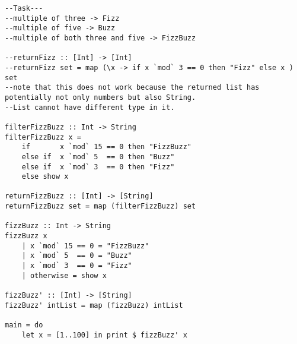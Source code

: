 \begin{lstlisting}
--Task---
--multiple of three -> Fizz
--multiple of five -> Buzz
--multiple of both three and five -> FizzBuzz

--returnFizz :: [Int] -> [Int]
--returnFizz set = map (\x -> if x `mod` 3 == 0 then "Fizz" else x ) set
--note that this does not work because the returned list has potentially not only numbers but also String.
--List cannot have different type in it.

filterFizzBuzz :: Int -> String
filterFizzBuzz x =
    if       x `mod` 15 == 0 then "FizzBuzz"
    else if  x `mod` 5  == 0 then "Buzz"
    else if  x `mod` 3  == 0 then "Fizz"
    else show x

returnFizzBuzz :: [Int] -> [String]
returnFizzBuzz set = map (filterFizzBuzz) set

fizzBuzz :: Int -> String
fizzBuzz x
    | x `mod` 15 == 0 = "FizzBuzz"
    | x `mod` 5  == 0 = "Buzz"
    | x `mod` 3  == 0 = "Fizz"
    | otherwise = show x

fizzBuzz' :: [Int] -> [String]
fizzBuzz' intList = map (fizzBuzz) intList

main = do
    let x = [1..100] in print $ fizzBuzz' x
 \end{lstlisting}
